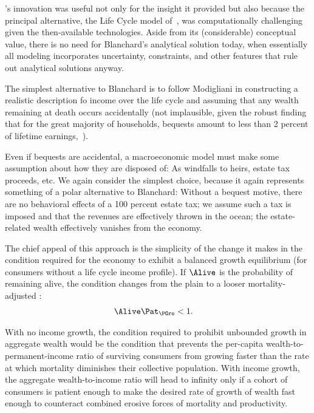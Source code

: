 \documentclass[BufferStockTheory]{subfiles}
\begin{document}
\cite{blanchardFinite}'s innovation was useful not only for the insight it provided but also because the principal alternative, the Life Cycle model of~\cite{modiglianiWealth}, was computationally challenging given the then-available technologies. Aside from its (considerable) conceptual value, there is no need for Blanchard's analytical solution today, when essentially all modeling incorporates uncertainty, constraints, and other features that rule out analytical solutions anyway.%

The simplest alternative to Blanchard is to follow Modigliani in constructing a realistic description fo income over the life cycle and assuming that any wealth remaining at death occurs accidentally (not implausible, given the robust finding that for the great majority of households, bequests amount to less than 2 percent of lifetime earnings,~\cite{hendricksBequests,hendricksSmallBequests}).

Even if bequests are accidental, a macroeconomic model must make some assumption about how they are disposed of: As windfalls to heirs, estate tax proceeds, etc. We again consider the simplest choice, because it again represents something of a polar alternative to Blanchard: Without a bequest motive, there are no behavioral effects of a 100 percent estate tax; we assume such a tax is imposed and that the revenues are effectively thrown in the ocean; the estate-related wealth effectively vanishes from the economy.

The chief appeal of this approach is the simplicity of the change it makes in the condition required for the economy to exhibit a balanced growth equilibrium (for consumers without a life cycle income profile).  If $\Alive$ is the probability of remaining alive, the condition changes from the plain {\GIC} to a looser mortality-adjusted {\GIC}:
\hypertarget{GICMrt}{}
\begin{align}
  \Alive  \Pat_{\PGro} & < 1. \label{eq:GICMrt}
\end{align}

With no income growth, the condition required to prohibit unbounded growth in aggregate wealth would be the condition that prevents the per-capita wealth-to-permanent-income ratio of surviving consumers from growing faster than the rate at which mortality diminishes their collective population.  With income growth, the aggregate wealth-to-income ratio will head to infinity only if a cohort of consumers is patient enough to make the desired rate of growth of wealth fast enough to counteract combined erosive forces of mortality and productivity.
\end{document}

